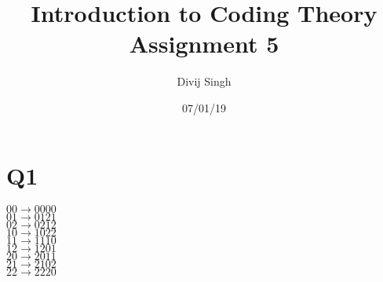\documentclass{article}
\title{Introduction to Coding Theory Assignment 5}
\author{Divij Singh}
\date{07/01/19}
\begin{document}
	\maketitle
	
	\section{Q1}
$00 \rightarrow 0000$\\
$01 \rightarrow 0121$\\
$02 \rightarrow 0212$\\
$10 \rightarrow 1022$\\
$11 \rightarrow 1110$\\
$12 \rightarrow 1201$\\
$20 \rightarrow 2011$\\
$21 \rightarrow 2102$\\
$22 \rightarrow 2220$\\
\end{document}
